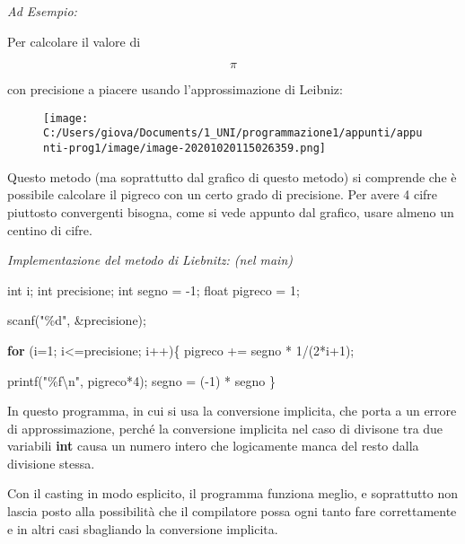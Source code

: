 \documentclass[
]{article}
\newenvironment{Shaded}{}{}
\newcommand{\ControlFlowTok}[1]{\textcolor[rgb]{0.00,0.44,0.13}{\textbf{#1}}}
\newcommand{\DataTypeTok}[1]{\textcolor[rgb]{0.56,0.13,0.00}{#1}}
\newcommand{\DecValTok}[1]{\textcolor[rgb]{0.25,0.63,0.44}{#1}}
\newcommand{\NormalTok}[1]{#1}
\newcommand{\SpecialCharTok}[1]{\textcolor[rgb]{0.25,0.44,0.63}{#1}}
\newcommand{\StringTok}[1]{\textcolor[rgb]{0.25,0.44,0.63}{#1}}
\begin{document}
\emph{Ad Esempio:}

Per calcolare il valore di

\[\pi\]

con precisione a piacere usando l'approssimazione di Leibniz:

\begin{figure}
\centering
\texttt{[image: C:/Users/giova/Documents/1\_UNI/programmazione1/appunti/appunti-prog1/image/image-20201020115026359.png]}
\caption{}
\end{figure}

Questo metodo (ma soprattutto dal grafico di questo metodo) si comprende
che è possibile calcolare il pigreco con un certo grado di precisione.
Per avere 4 cifre piuttosto convergenti bisogna, come si vede appunto
dal grafico, usare almeno un centino di cifre.

\emph{Implementazione del metodo di Liebnitz: (nel main)}

\begin{Shaded}
\begin{Highlighting}[]
\DataTypeTok{int}\NormalTok{ i;}
\DataTypeTok{int}\NormalTok{ precisione;}
\DataTypeTok{int}\NormalTok{ segno = {-}}\DecValTok{1}\NormalTok{;}
\DataTypeTok{float}\NormalTok{ pigreco = }\DecValTok{1}\NormalTok{;}

\NormalTok{scanf(}\StringTok{"\%d"}\NormalTok{, \&precisione);}

\ControlFlowTok{for}\NormalTok{ (i=}\DecValTok{1}\NormalTok{; i\textless{}=precisione; i++)\{}
\NormalTok{	pigreco += segno * }\DecValTok{1}\NormalTok{/(}\DecValTok{2}\NormalTok{*i+}\DecValTok{1}\NormalTok{);}
    
\NormalTok{    printf(}\StringTok{"\%f}\SpecialCharTok{\textbackslash{}n}\StringTok{"}\NormalTok{, pigreco*}\DecValTok{4}\NormalTok{);}
\NormalTok{    segno = ({-}}\DecValTok{1}\NormalTok{) * segno}
\NormalTok{\}}
\end{Highlighting}
\end{Shaded}

In questo programma, in cui si usa la conversione implicita, che porta a
un errore di approssimazione, perché la conversione implicita nel caso
di divisone tra due variabili \textbf{int} causa un numero intero che
logicamente manca del resto dalla divisione stessa.

Con il casting in modo esplicito, il programma funziona meglio, e
soprattutto non lascia posto alla possibilità che il compilatore possa
ogni tanto fare correttamente e in altri casi sbagliando la conversione
implicita.
\end{document}

